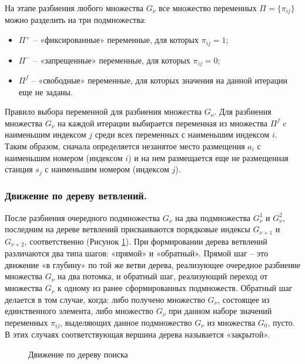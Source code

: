 На этапе разбиения любого множества $G_\nu$ все множество переменных $\Pi = \{\pi_{ij}\}$ можно разделить на три подмножества: 

\begin{itemize}
  \item $\Pi^+$ -- «фиксированные» переменные, для которых $\pi_{ij}=1$;
  \item $\Pi^-$ -- «запрещенные» переменные, для которых $\pi_{ij}=0$;
  \item $\Pi^f$ -- «свободные» переменные, для которых значения на данной итерации еще не заданы.
\end{itemize}
Правило выбора переменной для разбиения множества $G_\nu$. Для разбиения множества $G_\nu$ на каждой итерации выбирается переменная из множества $\Pi^f$ c наименьшим индексом $j$ среди всех переменных с наименьшим индексом $i$. Таким образом, сначала определяется незанятое место размещения $a_i$ с наименьшим номером (индексом $i$) и на нем размещается еще не размещенная станция $s_j$ с наименьшим номером (индексом $j$).

\subsubsection{Движение по дереву ветвлений.}

После разбиения очередного подмножества $G_\nu$ на два подмножества $G^1_\nu$  и $G^2_\nu$, последним на дереве ветвлений присваиваются порядковые индексы $G_{\nu+1}$ и $G_{\nu+2}$, соответственно (Рисунок \ref{fig:part2_tree_traversal}).
При формировании дерева ветвлений различаются два типа шагов: «прямой» и «обратный». Прямой шаг -- это движение «в глубину» по той же ветви дерева, реализующее очередное разбиение множества $G_\nu$ на два потомка, и обратный шаг, реализующий переход от множества $G_\nu$  к одному из ранее сформированных подмножеств. Обратный шаг делается в том случае, когда: либо получено множество $G_\nu$, состоящее из единственного элемента, либо множество $G_\nu$  при данном наборе значений переменных $\pi_{ij}$, выделяющих данное подмножество $G_\nu$ из множества $G_0$, пусто. В этих случаях соответствующая вершина дерева называется «закрытой».

\begin{figure}[ht]
  \caption{Движение по дереву поиска}\label{fig:part2_tree_traversal}
\end{figure}

